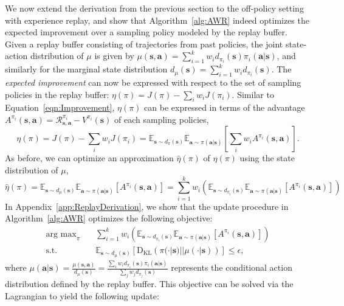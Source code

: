 \documentclass{article} \usepackage{iclr2020_conference,times}
\def\rva{{\mathbf{a}}}
\def\rvs{{\mathbf{s}}}
\newcommand{\dpii}{d_{\pi_i}}
\newcommand{\dpi}{d_{\pi}}
\newcommand{\weighti}{w_i}
\newcommand{\pii}{\pi_i}
\newcommand{\expec}{\mathbb{E}}
\begin{document}
We now extend the derivation from the previous section to the off-policy setting with experience replay, and show that Algorithm~\ref{alg:AWR} indeed optimizes the expected improvement over a sampling policy modeled by the replay buffer. Given a replay buffer consisting of trajectories from past policies, the joint state-action distribution of $\mu$ is given by $\mu(\rvs, \rva) = \sum_{i=1}^k \weighti \dpii(\rvs) \pi_i(\rva | \rvs)$, and similarly for the marginal state distribution $d_\mu(\rvs) = \sum_{i=1}^k \weighti \dpii(\rvs)$. The \textit{expected improvement} can now be expressed with respect to the set of sampling policies in the replay buffer: $\eta(\pi) = J(\pi) - \sum_{i} \weighti J(\pi_i)$. Similar to Equation~\ref{eqn:Improvement}, $\eta(\pi)$ can be expressed in terms of the advantage ${A^{\pi_i}(\rvs, \rva) = \mathcal{R}_{\rvs, \rva}^{\pi_i} - V^{\pi_i}(\rvs)}$ of each sampling policies,
\begin{equation}
    \eta(\pi) = J(\pi) - \sum_{i} \weighti J(\pii)  = \expec_{\rvs \sim \dpi(\rvs)}\expec_{\rva \sim \pi(\rva|\rvs)}\left[ \sum_i \weighti A^{\pii}(\rvs, \rva) \right] .
\end{equation}
As before, we can optimize an approximation $\hat{\eta}(\pi)$ of $\eta(\pi)$ using the state distribution of $\mu$,
\begin{equation}
    \hat{\eta}(\pi) = \expec_{\rvs \sim d_{\mu}(\rvs)} \expec_{\rva \sim \pi(\rva|\rvs)} \left[A^{\pii}(\rvs, \rva) \right] = \sum_{i=1}^k \weighti \left( \expec_{\rvs \sim d_{\pii}(\rvs)} \expec_{\rva \sim \pi(\rva|\rvs)} \left[A^{\pii}(\rvs, \rva) \right] \right)
\end{equation}
In Appendix~\ref{app:ReplayDerivation}, we show that the update procedure in Algorithm~\ref{alg:AWR} optimizes the following objective:
\begin{align}
    \mathop{\mathrm{arg \ max}}_{\pi} \quad & \sum_{i=1}^k \weighti \left( \expec_{\rvs \sim d_{\pii}(\rvs)} \expec_{\rva \sim \pi(\rva|\rvs)} \left[A^{\pii}(\rvs, \rva) \right] \right) \\
    \textrm{s.t.} \quad & \expec_{\rvs \sim d_\mu(\rvs)} \left[ \mathrm{D_{KL}} \left( \pi(\cdot |\rvs) || \mu(\cdot |\rvs) \right) \right] \leq \epsilon ,
\end{align}
where $\mu(\rva|\rvs) = \frac{\mu(\rvs, \rva)}{d_\mu(\rvs)} = \frac{\sum_i \weighti d_{\pii}(\rvs) \pi_i(\rva|\rvs)}{\sum_j w_j d_{\pi_j}(\rvs)}$ represents the conditional action distribution defined by the replay buffer. This objective can be solved via the Lagrangian to yield the following update:
\end{document}
